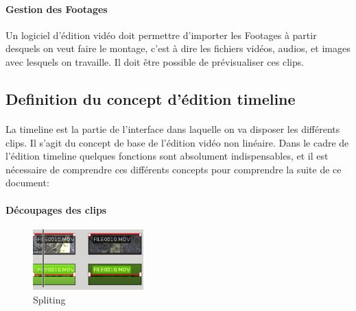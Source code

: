 \paragraph{Gestion des Footages}

Un logiciel d'édition vidéo doit permettre d'importer les Footages
 à partir desquels on veut faire le montage, c'est
à dire les fichiers vidéos, audios, et images avec lesquels on
travaille. Il doit être possible de prévisualiser ces clips.

\subsection{Definition du concept d'édition timeline}

\paragraph{}

La timeline est la partie de l'interface dans laquelle on va disposer
les différents clips. Il s'agit du concept de base de l'édition vidéo
non linéaire.  Dans le cadre de l'édition timeline quelques fonctions
sont absolument indispensables, et il est nécessaire de comprendre ces
différents concepts pour comprendre la suite de ce document:

\paragraph{Découpages des clips}

\begin{figure}

  \vspace{-20pt} \begin{center}

    \includegraphics[width=0.38\textwidth]{images/splited}

  \end{center} \vspace{-20pt} \caption{Spliting} \label{Yes}

  \vspace{-10pt}

\end{figure}

